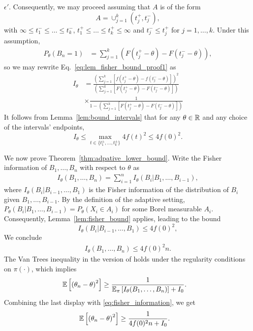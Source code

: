 \begin{proof-of-lemma}[\ref{lem:fisher_bound}]
  $\epsilon'$. Consequently, we may proceed assuming that
  $A$ is of the form
  \begin{equation*}
    A = \cup_{j=1}^k (t^+_j,t^-_j),
  \end{equation*}
  with $\infty \leq t^-_1 \leq \ldots \leq t^-_k$, $t^+_1 \leq \ldots \leq t^+_k \leq \infty$ and $t^-_j \leq t^+_j$ for $j=1,\ldots,k$. Under this assumption, 
  \begin{align*}
    P_{\theta}(B_n=1) & = \sum_{j=1}^k \left( F \left(t^+_j-\theta\right) -  F \left(t^-_j-\theta\right)  \right),
  \end{align*}
  so we may rewrite Eq.~\eqref{eq:lem_fisher_bound_proof1} as
  \begin{align*}
    I_\theta & = \frac { \left( \sum_{j=1}^{k} \left[ f \left(t^+_j-\theta \right) - f \left( t^-_j-\theta \right) \right] \right)^2 } 
    { \left( \sum_{j=1}^k \left[ F \left( t^+_j-\theta \right) - F \left( t^-_j-\theta \right) \right] \right) }  \nonumber \\
    & \times \frac {1} 
    {1- \left( \sum_{j=1}^k \left[ F \left(  t^+_j-\theta \right) - F \left( t^-_j-\theta \right) \right] \right) } 
  \end{align*}
  It follows from Lemma~\ref{lem:bound_intervals} that for any $\theta \in \mathbb{R}$ and any choice of the intervals' endpoints,
  \begin{equation*}
    I_\theta \le
    \max_{t \in \{t^\pm_1,\ldots,t^\pm_k\} } 4f(t)^2 \leq 4 f(0)^2. 
  \end{equation*}
\end{proof-of-lemma}

We now prove Theorem~\ref{thm:adpative_lower_bound}. Write the Fisher information of $B_1,\ldots,B_n$ with respect to $\theta$ as 
\begin{align*}
I_\theta(B_1,\ldots,B_n) = \sum_{i=1}^n I_\theta (B_i|B_1,\ldots,B_{i-1}),
\end{align*}
where $I_\theta (B_i|B_{i-1},\ldots,B_1)$ is the Fisher information of the distribution of $B_i$ given $B_1,\ldots,B_{i-1}$. By the definition of the adaptive setting, $P_{\theta}(B_i|B_1,\ldots,B_{i-1}) = P_{\theta}(X_i \in A_i)$ for some Borel measurable $A_i$. Consequently, Lemma~\ref{lem:fisher_bound} applies, leading to the bound
\[
 I_\theta (B_i|B_{i-1},\ldots,B_1) \leq 4f(0)^2,
\]
We conclude
\begin{align}
I_\theta(B_1,\ldots,B_n) \leq 4f(0)^2 n
\label{eq:fisher_information}.
\end{align}
The Van Trees inequality in the version of 
\cite{gill1995applications} holds under the regularity conditions on $\pi(\cdot)$, which implies
\begin{align*}
\mathbb{E}\left[  \left( \theta_n - \theta \right)^2\right] &  \geq \frac{1}{ \mathbb{E}_{\pi} \left[ I_\theta(B_1,\ldots,B_n)\right] + I_0}.
\end{align*}
Combining the last display with \eqref{eq:fisher_information}, we get
\begin{align*}
\mathbb{E}\left[  \left( \theta_n - \theta \right)^2\right] &  \geq \frac{1}{ 4f(0)^2 n + I_0}.
\end{align*}


